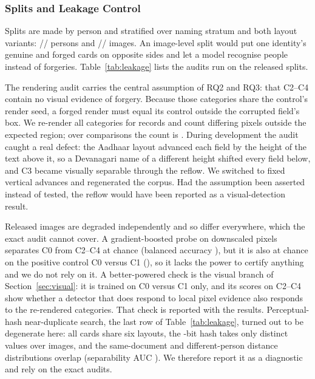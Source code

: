 \documentclass[12pt]{article}
\begin{document}
\subsubsection{Splits and Leakage Control}
\label{subsec:leakage}
\label{subsec:probe}

Splits are made by person and stratified over naming stratum and both
layout variants: \dsTrainPer/\dsValPer/\dsTestPer{} persons and
\dsTrainImg/\dsValImg/\dsTestImg{} images. An image-level split would
put one identity's genuine and forged cards on opposite sides and let a
model recognise people instead of forgeries. Table~\ref{tab:leakage}
lists the audits run on the released splits.


The rendering audit carries the central assumption of RQ2 and RQ3: that
C2--C4 contain no visual evidence of forgery. Because those categories
share the control's render seed, a forged render must equal its control
outside the corrupted field's box. We re-render all categories for
\dsProbeRecords{} records and count differing pixels outside the
expected region; over \dsProbeComparisons{} comparisons the count is
\dsProbeOutside. During development the audit caught a real defect: the Aadhaar layout advanced each
field by the height of the text above it, so a Devanagari name of a
different height shifted every field below, and C3 became visually
separable through the reflow. We switched to fixed vertical advances and
regenerated the corpus. Had the assumption been asserted instead of
tested, the reflow would have been reported as a visual-detection
result.

Released images are degraded independently and so differ everywhere,
which the exact audit cannot cover. A gradient-boosted probe on
downscaled pixels separates C0 from C2--C4 at chance (balanced accuracy
\dsProbeCritical), but it is also at chance on the positive control C0
versus C1 (\dsProbeControl), so it lacks the power to certify anything
and we do not rely on it. A better-powered check is the visual branch
of Section~\ref{sec:visual}: it is trained on C0 versus C1 only, and its
scores on C2--C4 show whether a detector that does respond to local
pixel evidence also responds to the re-rendered categories. That check
is reported with the results. Perceptual-hash near-duplicate search, the
last row of Table~\ref{tab:leakage}, turned out to be degenerate here:
all cards share six layouts, the \dsPhashBits-bit hash takes only
\dsPhashDistinct{} distinct values over \dsImages{} images, and the
same-document and different-person distance distributions overlap
(separability AUC \dsPhashAUC). We therefore report it as a diagnostic
and rely on the exact audits.
\end{document}

